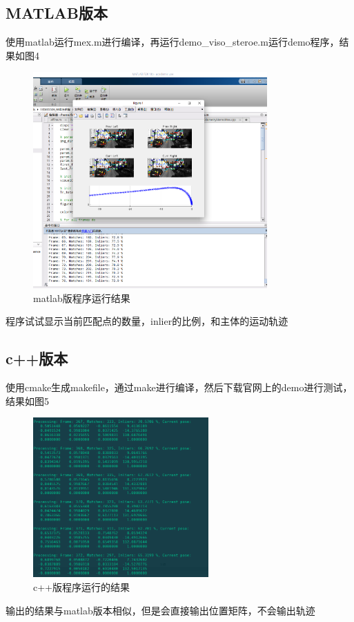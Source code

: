 \documentclass[UTF8]{ctexart}
\begin{document}
    \subsection{MATLAB版本}
    使用matlab运行mex.m进行编译，再运行demo\_viso\_steroe.m运行demo程序，结果如图4
    \begin{figure}[H]
        \centering
        \includegraphics[width=0.8\textwidth]{img/matlab.png} 
        \caption{matlab版程序运行结果}
        \label{fig.4}
    \end{figure}
    程序试试显示当前匹配点的数量，inlier的比例，和主体的运动轨迹
    \subsection{c++版本}
    使用cmake生成makefile，通过make进行编译，然后下载官网上的demo进行测试，结果如图5
    \begin{figure}[H]
        \centering
        \includegraphics[width=0.6\textwidth]{img/c++.png} 
        \caption{c++版程序运行的结果}
        \label{fig.5}
    \end{figure}
    输出的结果与matlab版本相似，但是会直接输出位置矩阵，不会输出轨迹
\end{document}
